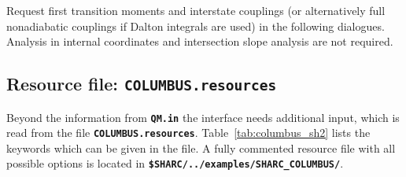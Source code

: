 \documentclass[a4paper,10pt,DIV=15,openany,twoside=false]{scrbook}
\newcommand{\ttt}[1]{\textbf{\texttt{#1}}}
\begin{document}
Request first transition moments and interstate couplings (or alternatively full nonadiabatic couplings if Dalton integrals are used) in the following dialogues. Analysis in internal coordinates and intersection slope analysis are not required.

\subsection{Resource file: \ttt{COLUMBUS.resources}}

Beyond the information from \ttt{QM.in} the interface needs additional input, which is read from the file \ttt{COLUMBUS.resources}. Table~\ref{tab:columbus_sh2} lists the keywords which can be given in the file.
A fully commented resource file with all possible options is located in \ttt{\$SHARC/../examples/SHARC\_COLUMBUS/}.
\end{document}
